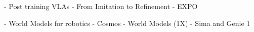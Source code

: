 - Post training VLAs
    - From Imitation to Refinement
    - EXPO

- World Models for robotics
    - Cosmos
    - World Models (1X)
    - Sima and Genie 1
